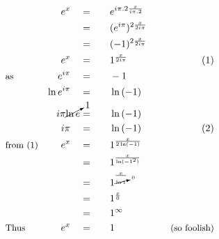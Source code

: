 \begin{alignat*}{5}
&\,&e^x\quad&=\quad&&e^{i\pi.2\frac{x}{i\pi.2}}\\
&\,&\,&=&&(e^{i\pi})^{2\frac{x}{2i\pi}}\\
&\,&\,&=&&(-1)^{2\frac{x}{2i\pi}}\\
&\,&e^x\quad&=&&1^\frac{x}{2i\pi}\qquad&\small(1)\\
&\small\text{as}&e^{i\pi}\quad&=&&-1\\
&\,&\ln{e^{i\pi}}\quad&=&&\ln{(-1)}\\
&\,&i\pi\cancelto{1}{\ln{e}}&=&&\ln{(-1)}\\
&\,&i\pi\quad&=&&\ln{(-1)}\qquad&\small(2)\\
&\small\text{from (1)}&e^x\quad&=&&1^\frac{x}{2\ln(-1)}\\
&\,&\,&=&&1^\frac{x}{\ln(-1^2)}\\
&\,&\,&=&&1^\frac{x}{\cancelto{0}{\ln{1}}}\\
&\,&\,&=&&1^\frac{x}{0}\\
&\,&\,&=&&1^\infty\\
&\small\text{Thus}&e^x\quad&=&&1\qquad&\small\text{(so foolish)}
\end{alignat*}
